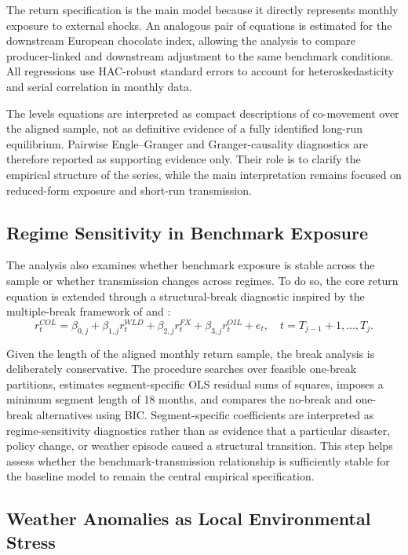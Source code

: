\documentclass[11pt]{article}
\begin{document}
The return specification is the main model because it directly represents monthly exposure to external shocks. An analogous pair of equations is estimated for the downstream European chocolate index, allowing the analysis to compare producer-linked and downstream adjustment to the same benchmark conditions. All regressions use HAC-robust standard errors to account for heteroskedasticity and serial correlation in monthly data.

The levels equations are interpreted as compact descriptions of co-movement over the aligned sample, not as definitive evidence of a fully identified long-run equilibrium. Pairwise Engle--Granger and Granger-causality diagnostics are therefore reported as supporting evidence only. Their role is to clarify the empirical structure of the series, while the main interpretation remains focused on reduced-form exposure and short-run transmission.

\subsection{Regime Sensitivity in Benchmark Exposure}

The analysis also examines whether benchmark exposure is stable across the sample or whether transmission changes across regimes. To do so, the core return equation is extended through a structural-break diagnostic inspired by the multiple-break framework of \citet{BaiPerron1998} and \citet{BaiPerron2003}:
\begin{equation}
r^{COL}_{t} = \beta_{0,j} + \beta_{1,j}r^{WLD}_{t} + \beta_{2,j}r^{FX}_{t} + \beta_{3,j}r^{OIL}_{t} + e_t,
\quad t=T_{j-1}+1,\ldots,T_j .
\label{eq:break_returns}
\end{equation}

Given the length of the aligned monthly return sample, the break analysis is deliberately conservative. The procedure searches over feasible one-break partitions, estimates segment-specific OLS residual sums of squares, imposes a minimum segment length of 18 months, and compares the no-break and one-break alternatives using BIC. Segment-specific coefficients are interpreted as regime-sensitivity diagnostics rather than as evidence that a particular disaster, policy change, or weather episode caused a structural transition. This step helps assess whether the benchmark-transmission relationship is sufficiently stable for the baseline model to remain the central empirical specification.
\subsection{Weather Anomalies as Local Environmental Stress}
\end{document}
